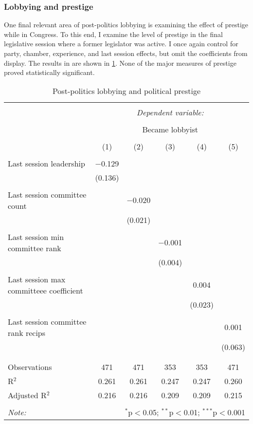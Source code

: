 \documentclass{article}
\begin{document}
\subsubsection{Lobbying and prestige}
\label{result:lobbying_prestige}
One final relevant area of post-politics lobbying is examining the effect of prestige while in Congress. To this end, I examine the level of prestige in the final legislative session where a former legislator was active. I once again control for party, chamber, experience, and last session effects, but omit the coefficients from display. The results in are shown in \ref{tab:lobbying_prestige}. None of the major measures of prestige proved statistically significant. 
\begin{table}[!htbp] \centering 
    \caption{Post-politics lobbying and political prestige} 
    \label{tab:lobbying_prestige} 
  \begin{tabular}{@{\extracolsep{5pt}}lccccc} 
  \\[-1.8ex]\hline 
  \hline \\[-1.8ex] 
   & \multicolumn{5}{c}{\textit{Dependent variable:}} \\ 
  \cline{2-6} 
  \\[-1.8ex] & \multicolumn{5}{c}{Became lobbyist} \\ 
  \\[-1.8ex] & (1) & (2) & (3) & (4) & (5)\\ 
  \hline \\[-1.8ex] 
   Last session leadership & $-$0.129 &  &  &  &  \\ 
    & (0.136) &  &  &  &  \\ 
    & & & & & \\ 
   Last session committee count &  & $-$0.020 &  &  &  \\ 
    &  & (0.021) &  &  &  \\ 
    & & & & & \\ 
   Last session min committee rank &  &  & $-$0.001 &  &  \\ 
    &  &  & (0.004) &  &  \\ 
    & & & & & \\ 
   Last session max committeee coefficient &  &  &  & 0.004 &  \\ 
    &  &  &  & (0.023) &  \\ 
    & & & & & \\ 
    Last session committee rank recips &  &  &  &  & 0.001 \\ 
    &  &  &  &  & (0.063) \\ 
    & & & & & \\ 
  \hline \\[-1.8ex] 
  Observations & 471 & 471 & 353 & 353 & 471 \\ 
  R$^{2}$ & 0.261 & 0.261 & 0.247 & 0.247 & 0.260 \\ 
  Adjusted R$^{2}$ & 0.216 & 0.216 & 0.209 & 0.209 & 0.215 \\ 
  \hline 
  \hline \\[-1.8ex] 
  \textit{Note:}  & \multicolumn{5}{r}{$^{*}$p$<$0.05; $^{**}$p$<$0.01; $^{***}$p$<$0.001} \\ 
  \end{tabular} 
  \end{table}
\end{document}
